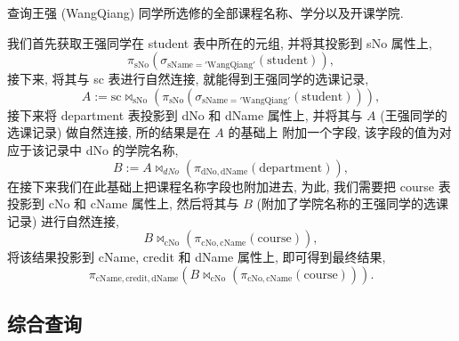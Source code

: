 \documentclass[10pt,UTF8]{book} %
\begin{document}
\begin{example}
    查询王强 (WangQiang) 同学所选修的全部课程名称、学分以及开课学院.
    \begin{sol}
        我们首先获取王强同学在 student 表中所在的元组, 并将其投影到
        sNo 属性上,
        \[ \pi_\mathrm{sNo} \left(
            \sigma_\mathrm{sName = 'WangQiang'} \left(
                \mathrm{student}
            \right)
        \right), \]
        接下来, 将其与 sc 表进行自然连接, 就能得到王强同学的选课记录,
        \[ A := \mathrm{sc} \Join_\mathrm{sNo} \left(
            \pi_\mathrm{sNo} \left(
            \sigma_\mathrm{sName = 'WangQiang'} \left(
                \mathrm{student}
            \right)
        \right)
        \right), \]
        接下来将 department 表投影到 dNo 和 dName 属性上, 并将其与
        $A$ (王强同学的选课记录) 做自然连接, 所的结果是在 $A$ 的基础上
        附加一个字段, 该字段的值为对应于该记录中 dNo 的学院名称,
        \[ B := A \Join_{dNo} \left(
            \pi_\mathrm{dNo, dName} \left(
                \mathrm{department}
            \right)
        \right), \]
        在接下来我们在此基础上把课程名称字段也附加进去, 为此, 我们需要把
        course 表投影到 cNo 和 cName 属性上, 然后将其与 $B$
        (附加了学院名称的王强同学的选课记录)
        进行自然连接,
        \[ B \Join_\mathrm{cNo} \left(
            \pi_\mathrm{cNo, cName} \left(
                \mathrm{course}
            \right)
        \right), \]
        将该结果投影到 cName, credit 和 dName 属性上,
        即可得到最终结果,
        \[ \pi_\mathrm{cName, credit, dName} \left(
            B \Join_\mathrm{cNo} \left(
            \pi_\mathrm{cNo, cName} \left(
                \mathrm{course}
            \right)
        \right)
        \right). \]
    \end{sol}
\end{example}

\subsection{综合查询}
\end{document}
